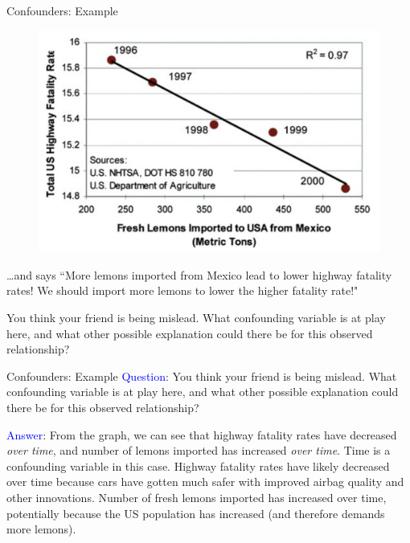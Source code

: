 \documentclass[10pt,t]{beamer}
\begin{document}
\begin{frame}{Confounders: Example}
	\vspace{-0.6cm}
\begin{figure}
	\centering \includegraphics[scale=0.3]{lemons.png}
\end{figure}

\vspace{0.1cm} 

\dots and says ``More lemons imported from Mexico lead to lower highway fatality rates! We should import more lemons to lower the higher fatality rate!"

\vspace{0.3cm}

You think your friend is being mislead. What confounding variable is at play here, and what other possible explanation could there be for this observed relationship?
\end{frame}

\begin{frame}{Confounders: Example}
\textcolor{blue}{Question}: You think your friend is being mislead. What confounding variable is at play here, and what other possible explanation could there be for this observed relationship?

\vspace{0.3cm}

\textcolor{blue}{Answer}: From the graph, we can see that highway fatality rates have decreased \textit{over time}, and number of lemons imported has increased \textit{over time}. Time is a confounding variable in this case. Highway fatality rates have likely decreased over time because cars have gotten much safer with improved airbag quality and other innovations. Number of fresh lemons imported has increased over time, potentially because the US population has increased (and therefore demands more lemons).
\end{frame}
\end{document}
